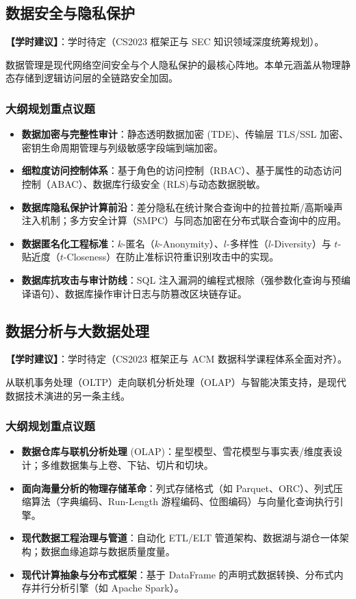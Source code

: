 \subsection{数据安全与隐私保护}
\textbf{【学时建议】}：学时待定（CS2023 框架正与 SEC 知识领域深度统筹规划）。

数据管理是现代网络空间安全与个人隐私保护的最核心阵地。本单元涵盖从物理静态存储到逻辑访问层的全链路安全加固。

\subsubsection{大纲规划重点议题}
\begin{itemize}
    \item \textbf{数据加密与完整性审计}：静态透明数据加密 (TDE)、传输层 TLS/SSL 加密、密钥生命周期管理与列级敏感字段端到端加密。
    \item \textbf{细粒度访问控制体系}：基于角色的访问控制（RBAC）、基于属性的动态访问控制（ABAC）、数据库行级安全 (RLS)与动态数据脱敏。
    \item \textbf{数据库隐私保护计算前沿}：差分隐私在统计聚合查询中的拉普拉斯/高斯噪声注入机制；多方安全计算（SMPC）与同态加密在分布式联合查询中的应用。
    \item \textbf{数据匿名化工程标准}：$k$-匿名（$k$-Anonymity）、$l$-多样性（$l$-Diversity）与 $t$-贴近度（$t$-Closeness）在防止准标识符重识别攻击中的实现。
    \item \textbf{数据库抗攻击与审计防线}：SQL 注入漏洞的编程式根除（强参数化查询与预编译语句）、数据库操作审计日志与防篡改区块链存证。
\end{itemize}

\subsection{数据分析与大数据处理}
\textbf{【学时建议】}：学时待定（CS2023 框架正与 ACM 数据科学课程体系全面对齐）。

从联机事务处理（OLTP）走向联机分析处理（OLAP）与智能决策支持，是现代数据技术演进的另一条主线。

\subsubsection{大纲规划重点议题}
\begin{itemize}
    \item \textbf{数据仓库与联机分析处理} (OLAP)：星型模型、雪花模型与事实表/维度表设计；多维数据集与上卷、下钻、切片和切块。
    \item \textbf{面向海量分析的物理存储革命}：列式存储格式（如 Parquet、ORC）、列式压缩算法（字典编码、Run-Length 游程编码、位图编码）与向量化查询执行引擎。
    \item \textbf{现代数据工程治理与管道}：自动化 ETL/ELT 管道架构、数据湖与湖仓一体架构；数据血缘追踪与数据质量度量。
    \item \textbf{现代计算抽象与分布式框架}：基于 DataFrame 的声明式数据转换、分布式内存并行分析引擎（如 Apache Spark）。
\end{itemize}

